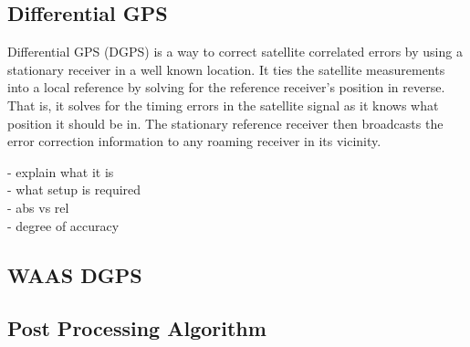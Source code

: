 \subsection{Differential GPS}
Differential GPS (DGPS) is a way to correct satellite correlated errors by using a stationary receiver in a well known location. It ties the satellite measurements into a local reference by solving for the reference receiver's position in reverse. That is, it solves for the timing errors in the satellite signal as it knows what position it should be in. The stationary reference receiver then broadcasts the error correction information to any roaming receiver in its vicinity. 


- explain what it is\\
- what setup is required \\
- abs vs rel \\
- degree of accuracy
\subsection{WAAS DGPS}



\subsection{Post Processing Algorithm}

